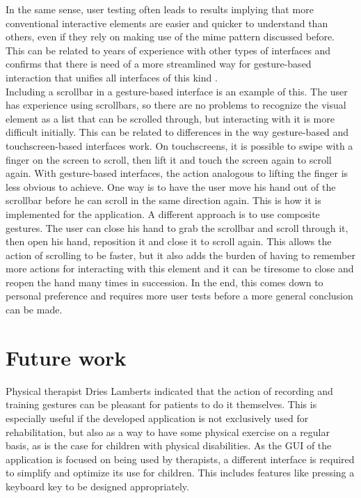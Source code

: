 In the same sense, user testing often leads to results implying that more conventional interactive elements are easier and quicker to understand than others, even if they rely on making use of the mime pattern discussed before. This can be related to years of experience with other types of interfaces and confirms that there is need of a more streamlined way for gesture-based interaction that unifies all interfaces of this kind \cite{Norman2010}.\\

Including a scrollbar in a gesture-based interface is an example of this. The user has experience using scrollbars, so there are no problems to recognize the visual element as a list that can be scrolled through, but interacting with it is more difficult initially. This can be related to differences in the way gesture-based and touchscreen-based interfaces work. On touchscreens, it is possible to swipe with a finger on the screen to scroll, then lift it and touch the screen again to scroll again. With gesture-based interfaces, the action analogous to lifting the finger is less obvious to achieve. One way is to have the user move his hand out of the scrollbar before he can scroll in the same direction again. This is how it is implemented for the application. A different approach is to use composite gestures. The user can close his hand to grab the scrollbar and scroll through it, then open his hand, reposition it and close it to scroll again. This allows the action of scrolling to be faster, but it also adds the burden of having to remember more actions for interacting with this element and it can be tiresome to close and reopen the hand many times in succession. In the end, this comes down to personal preference and requires more user tests before a more general conclusion can be made.\\


\section{Future work}

Physical therapist Dries Lamberts indicated that the action of recording and training gestures can be pleasant for patients to do it themselves. This is especially useful if the developed application is not exclusively used for rehabilitation, but also as a way to have some physical exercise on a regular basis, as is the case for children with physical disabilities. As the GUI of the application is focused on being used by therapists, a different interface is required to simplify and optimize its use for children. This includes features like pressing a keyboard key to be designed appropriately.\\


